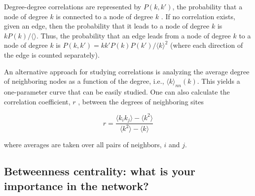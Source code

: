 \nd Degree-degree correlations are represented by $P(k, k')$, the probability that a node of degree $k$ is connected to a node of degree $k$ . If no correlation exists, given an edge, then the probability that it leads to a node of degree $k$ is $k P(k)/ \langle \rangle$. Thus, the probability that an edge leads from a node of degree $k$ to a node of degree $k$ is $P(k,k') = kk' P(k)P(k')/ \langle k \rangle^2$ (where each direction of the edge is counted separately). \s

\nd An alternative approach for studying correlations is analyzing the average
degree of neighboring nodes as a function of the degree, i.e., $\langle k\rangle_{nn} (k)$. This yields a one-parameter curve that can be easily studied. One can also calculate the correlation coefficient, $r$ , between the degrees of neighboring sites

\begin{equation}
    r = \frac{\langle k_i k_j \rangle - \langle k^2 \rangle}{\langle k^2 \rangle - \langle k \rangle}
\end{equation}

\nd where averages are taken over all pairs of neighbors, $i$ and $j$.


\subsection{Betweenness centrality: what is your importance in the network?}





